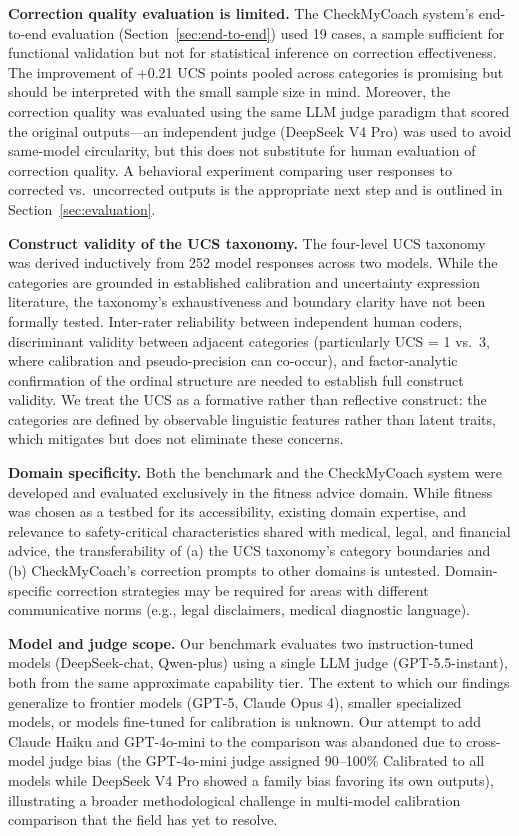 \documentclass[manuscript, review, anonymous]{acmart}
\begin{document}
\textbf{Correction quality evaluation is limited.} The CheckMyCoach system's end-to-end evaluation (Section~\ref{sec:end-to-end}) used 19 cases, a sample sufficient for functional validation but not for statistical inference on correction effectiveness. The improvement of +0.21 UCS points pooled across categories is promising but should be interpreted with the small sample size in mind. Moreover, the correction quality was evaluated using the same LLM judge paradigm that scored the original outputs---an independent judge (DeepSeek V4 Pro) was used to avoid same-model circularity, but this does not substitute for human evaluation of correction quality. A behavioral experiment comparing user responses to corrected vs.\ uncorrected outputs is the appropriate next step and is outlined in Section~\ref{sec:evaluation}.

\textbf{Construct validity of the UCS taxonomy.} The four-level UCS taxonomy was derived inductively from 252 model responses across two models. While the categories are grounded in established calibration and uncertainty expression literature, the taxonomy's exhaustiveness and boundary clarity have not been formally tested. Inter-rater reliability between independent human coders, discriminant validity between adjacent categories (particularly UCS = 1 vs.\ 3, where calibration and pseudo-precision can co-occur), and factor-analytic confirmation of the ordinal structure are needed to establish full construct validity. We treat the UCS as a formative rather than reflective construct: the categories are defined by observable linguistic features rather than latent traits, which mitigates but does not eliminate these concerns.

\textbf{Domain specificity.} Both the benchmark and the CheckMyCoach system were developed and evaluated exclusively in the fitness advice domain. While fitness was chosen as a testbed for its accessibility, existing domain expertise, and relevance to safety-critical characteristics shared with medical, legal, and financial advice, the transferability of (a) the UCS taxonomy's category boundaries and (b) CheckMyCoach's correction prompts to other domains is untested. Domain-specific correction strategies may be required for areas with different communicative norms (e.g., legal disclaimers, medical diagnostic language).

\textbf{Model and judge scope.} Our benchmark evaluates two instruction-tuned models (DeepSeek-chat, Qwen-plus) using a single LLM judge (GPT-5.5-instant), both from the same approximate capability tier. The extent to which our findings generalize to frontier models (GPT-5, Claude Opus 4), smaller specialized models, or models fine-tuned for calibration is unknown. Our attempt to add Claude Haiku and GPT-4o-mini to the comparison was abandoned due to cross-model judge bias (the GPT-4o-mini judge assigned 90--100\% Calibrated to all models while DeepSeek V4 Pro showed a family bias favoring its own outputs), illustrating a broader methodological challenge in multi-model calibration comparison that the field has yet to resolve.
\end{document}
